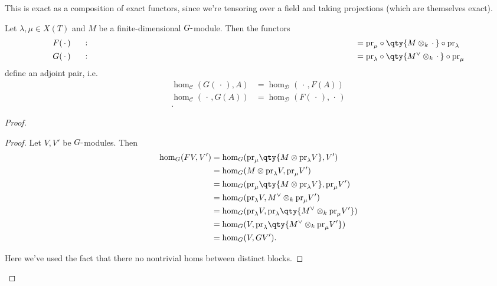 This is exact as a composition of exact functors, since we're tensoring
over a field and taking projections (which are themselves exact).

\begin{lemma}[?]

\begin{lemma}[?]

Let \(\lambda,\mu\in X(T)\) and \(M\) be a finite-dimensional
\(G{\hbox{-}}\)module. Then the functors
\begin{align*}   F({\,\cdot\,}) &\mathrel{\vcenter{:}}={\operatorname{pr}}_\mu \circ \qty{M\otimes_k {\,\cdot\,}} \circ {\operatorname{pr}}_\lambda \\ G({\,\cdot\,}) &\mathrel{\vcenter{:}}={\operatorname{pr}}_\lambda \circ \qty{M^\vee\otimes_k {\,\cdot\,}} \circ {\operatorname{pr}}_\mu \\ \end{align*}
define an adjoint pair,
i.e.~\begin{align*}   \hom_\mathcal{C}(G({\,\cdot\,}), A) &= \hom_\mathcal{D}({\,\cdot\,}, F(A)) \\ \hom_\mathcal{C}({\,\cdot\,}, G(A)) &= \hom_\mathcal{D}( F({\,\cdot\,}), {\,\cdot\,}) \\ .\end{align*}

\end{lemma}

\end{lemma}

\begin{proof}

\begin{proof}

Let \(V, V'\) be \(G{\hbox{-}}\)modules. Then
\begin{align*}   \hom_G(FV, V')  &= \hom_G( {\operatorname{pr}}_\mu\qty{ M\otimes{\operatorname{pr}}_\lambda V  }, V') \\ &= \hom_G(  M\otimes{\operatorname{pr}}_\lambda V  , {\operatorname{pr}}_\mu V') \\ &= \hom_G(  {\operatorname{pr}}_\mu \qty{ M\otimes{\operatorname{pr}}_\lambda V }  , {\operatorname{pr}}_\mu V') \\ &= \hom_G(  {\operatorname{pr}}_\lambda V  , M^\vee\otimes_k {\operatorname{pr}}_\mu V') \\ &= \hom_G(  {\operatorname{pr}}_\lambda V  , {\operatorname{pr}}_\lambda\qty{ M^\vee\otimes_k {\operatorname{pr}}_\mu V'} ) \\ &= \hom_G(  V  , {\operatorname{pr}}_\lambda\qty{ M^\vee\otimes_k {\operatorname{pr}}_\mu V'} ) \\ &= \hom_G(V, GV') .\end{align*}

Here we've used the fact that there no nontrivial homs between distinct
blocks.

\end{proof}

\end{proof}

